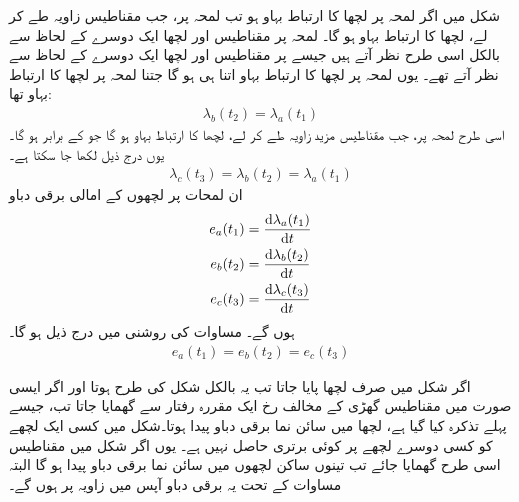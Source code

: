  شکل   میں اگر لمحہ  پر  لچھا  کا  ارتباط بہاو  ہو تب لمحہ  پر، جب مقناطیس  زاویہ طے کر لے،   لچھا  کا ارتباط بہاو  ہو گا۔  لمحہ  پر مقناطیس اور لچھا  ایک دوسرے کے لحاظ سے بالکل اسی طرح نظر آتے  ہیں جیسے  پر مقناطیس اور لچھا  ایک دوسرے کے لحاظ سے نظر آتے تھے۔ یوں لمحہ  پر لچھا  کا ارتباط بہاو  اتنا ہی ہو گا جتنا لمحہ  پر   لچھا کا ارتباط بہاو تھا:
\begin{align}
\lambda_b(t_2)=\lambda_a(t_1)
\end{align}
اسی طرح  لمحہ  پر، جب مقناطیس مزید   زاویہ طے کر لے، لچھا  کا ارتباط بہاو   ہو گا جو  کے برابر ہو گا۔یوں درج ذیل لکھا جا سکتا ہے۔
\begin{align}\label{مساوات_گھومتے_مشین_مختلف_اوقات_پر_تین_لچھے_یکساں}
\lambda_c(t_3)=\lambda_b(t_2)=\lambda_a(t_1)
\end{align}
ان لمحات پر  لچھوں کے امالی برقی دباو
\begin{align}
e_a(t_1)&=\frac{\dif \lambda_a(t_1)}{\dif t}\\
e_b(t_2)&=\frac{\dif \lambda_b(t_2)}{\dif t}\\
e_c(t_3)&=\frac{\dif \lambda_c(t_3)}{\dif t}
\end{align}
ہوں گے۔ مساوات     کی روشنی میں درج ذیل ہو گا۔
\begin{align}\label{مساوات_گھومتے_مشین_تین_لمحات_دباو_یکساں}
e_a(t_1)=e_b(t_2)=e_c(t_3)
\end{align} 

اگر شکل  میں صرف لچھا  پایا جاتا تب یہ بالکل شکل    کی طرح ہوتا اور اگر ایسی صورت  میں مقناطیس  گھڑی کے مخالف رخ ایک مقررہ رفتار  سے گھمایا جاتا تب، جیسے پہلے تذکرہ کیا گیا ہے، لچھا  میں سائن نما برقی دباو پیدا ہوتا۔شکل   میں کسی ایک لچھے کو کسی دوسرے لچھے پر کوئی برتری حاصل نہیں ہے۔ یوں اگر شکل   میں  مقناطیس اسی طرح گھمایا جائے تب  تینوں ساکن لچھوں میں سائن نما برقی دباو پیدا ہو گا البتہ مساوات     کے تحت یہ برقی دباو آپس میں    زاویہ پر ہوں گے۔


